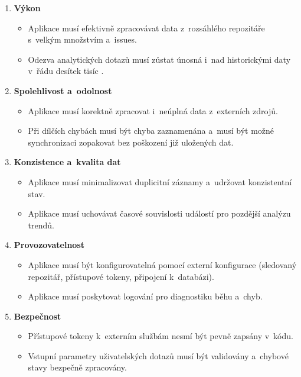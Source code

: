 \begin{enumerate}
  \item \textbf{Výkon}
    \begin{itemize}
      \item Aplikace musí efektivně zpracovávat data z~rozsáhlého repozitáře s~velkým množstvím \PR a~issues.
      \item Odezva analytických dotazů musí zůstat únosná i~nad historickými daty v~řádu desítek tisíc \PR.
    \end{itemize}

  \item \textbf{Spolehlivost a~odolnost}
    \begin{itemize}
      \item Aplikace musí korektně zpracovat i~neúplná data z~externích zdrojů.
      \item Při dílčích chybách musí být chyba zaznamenána a~musí být možné synchronizaci zopakovat bez poškození již uložených dat.
    \end{itemize}

  \item \textbf{Konzistence a~kvalita dat}
    \begin{itemize}
      \item Aplikace musí minimalizovat duplicitní záznamy a~udržovat konzistentní stav.
      \item Aplikace musí uchovávat časové souvislosti událostí pro pozdější analýzu trendů.
    \end{itemize}

  \item \textbf{Provozovatelnost}
    \begin{itemize}
      \item Aplikace musí být konfigurovatelná pomocí externí konfigurace (sledovaný repozitář, přístupové tokeny, připojení k~databázi).
      \item Aplikace musí poskytovat logování pro diagnostiku běhu a~chyb.
    \end{itemize}

  \item \textbf{Bezpečnost}
    \begin{itemize}
      \item Přístupové tokeny k~externím službám nesmí být pevně zapsány v~kódu.
      \item Vstupní parametry uživatelských dotazů musí být validovány a~chybové stavy bezpečně zpracovány.
    \end{itemize}
\end{enumerate}
